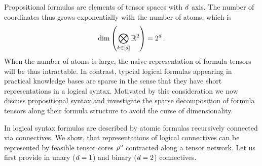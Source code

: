 Propositional formulas are elements of tensor spaces with $d$ axis. 
The number of coordinates thus grows exponentially with the number of atoms, which is
	\[ \mathrm{dim}\left(\bigotimes_{k\in[d]}\mathbb{R}^2\right) = 2^{d} \, . \]
When the number of atoms is large, the naive representation of formula tensors will be thus intractable.
In contrast, typcial logical formulas appearing in practical knowledge bases are sparse in the sense that they have short representations in a logical syntax.
Motivated by this consideration we now discuss propositional syntax and investigate the sparse decomposition of formula tensors along their formula structure to avoid the curse of dimensionality.

In logical syntax formulas are described by atomic formulas recursively connected via connectives. 
We show, that representations of logical connectives can be represented by feasible tensor cores $\rho^{\circ}$ contracted along a tensor network.
Let us first provide in  unary ($d=1$) and binary ($d=2$) connectives.

